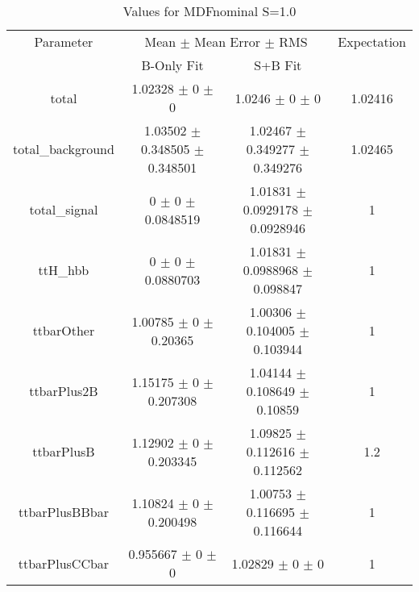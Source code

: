 \begin{table}
\centering
\caption{Values for MDFnominal S=1.0}
\begin{tabular}{cccc}
\toprule
Parameter & \multicolumn{2}{c}{Mean $\pm$ Mean Error $\pm$ RMS} & Expectation\\
 & B-Only Fit & S+B Fit & \\
\midrule
total & \num{1.02328} $\pm$ \num{0} $\pm$ \num{0} & \num{1.0246} $\pm$ \num{0} $\pm$ \num{0} & \num{1.02416}\\
total\_background & \num{1.03502} $\pm$ \num{0.348505} $\pm$ \num{0.348501} & \num{1.02467} $\pm$ \num{0.349277} $\pm$ \num{0.349276} & \num{1.02465}\\
total\_signal & \num{0} $\pm$ \num{0} $\pm$ \num{0.0848519} & \num{1.01831} $\pm$ \num{0.0929178} $\pm$ \num{0.0928946} & \num{1}\\
ttH\_hbb & \num{0} $\pm$ \num{0} $\pm$ \num{0.0880703} & \num{1.01831} $\pm$ \num{0.0988968} $\pm$ \num{0.098847} & \num{1}\\
ttbarOther & \num{1.00785} $\pm$ \num{0} $\pm$ \num{0.20365} & \num{1.00306} $\pm$ \num{0.104005} $\pm$ \num{0.103944} & \num{1}\\
ttbarPlus2B & \num{1.15175} $\pm$ \num{0} $\pm$ \num{0.207308} & \num{1.04144} $\pm$ \num{0.108649} $\pm$ \num{0.10859} & \num{1}\\
ttbarPlusB & \num{1.12902} $\pm$ \num{0} $\pm$ \num{0.203345} & \num{1.09825} $\pm$ \num{0.112616} $\pm$ \num{0.112562} & \num{1.2}\\
ttbarPlusBBbar & \num{1.10824} $\pm$ \num{0} $\pm$ \num{0.200498} & \num{1.00753} $\pm$ \num{0.116695} $\pm$ \num{0.116644} & \num{1}\\
ttbarPlusCCbar & \num{0.955667} $\pm$ \num{0} $\pm$ \num{0} & \num{1.02829} $\pm$ \num{0} $\pm$ \num{0} & \num{1}\\
\bottomrule
\end{tabular}
\end{table}